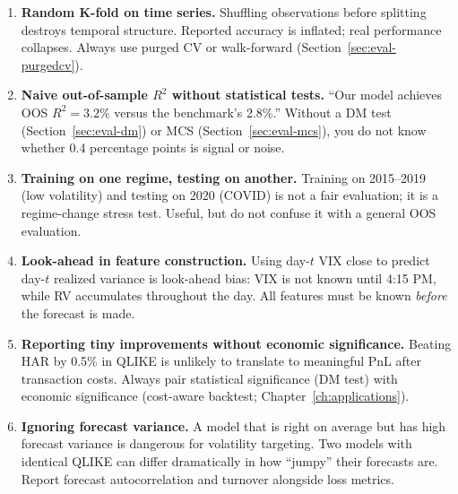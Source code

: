 \begin{warning}
\begin{enumerate}[nosep]
  \item \textbf{Random K-fold on time series.}
    Shuffling observations before splitting destroys temporal structure.
    Reported accuracy is inflated; real performance collapses.
    Always use purged CV or walk-forward (Section~\ref{sec:eval-purgedcv}).

  \item \textbf{Naive out-of-sample $R^2$ without statistical tests.}
    ``Our model achieves OOS $R^2 = 3.2\%$ versus the benchmark's 2.8\%.''
    Without a DM test (Section~\ref{sec:eval-dm}) or MCS (Section~\ref{sec:eval-mcs}), you do not know whether 0.4 percentage points is signal or noise.

  \item \textbf{Training on one regime, testing on another.}
    Training on 2015--2019 (low volatility) and testing on 2020 (COVID) is not a fair evaluation; it is a regime-change stress test.
    Useful, but do not confuse it with a general OOS evaluation.

  \item \textbf{Look-ahead in feature construction.}
    Using day-$t$ VIX close to predict day-$t$ realized variance is look-ahead bias: VIX is not known until 4:15 PM, while RV accumulates throughout the day.
    All features must be known \emph{before} the forecast is made.

  \item \textbf{Reporting tiny improvements without economic significance.}
    Beating HAR by 0.5\% in QLIKE is unlikely to translate to meaningful PnL after transaction costs.
    Always pair statistical significance (DM test) with economic significance (cost-aware backtest; Chapter~\ref{ch:applications}).

  \item \textbf{Ignoring forecast variance.}
    A model that is right on average but has high forecast variance is dangerous for volatility targeting.
    Two models with identical QLIKE can differ dramatically in how ``jumpy'' their forecasts are.
    Report forecast autocorrelation and turnover alongside loss metrics.
\end{enumerate}
\end{warning}



